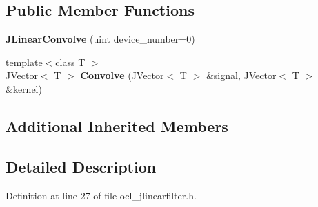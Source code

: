 \subsection*{Public Member Functions}
\begin{DoxyCompactItemize}
\item 
{\bfseries J\+Linear\+Convolve} (uint device\+\_\+number=0)\hypertarget{classjaspl_1_1ocl_1_1_j_linear_convolve_ac23d0dd668a469eb7ea80197c0074479}{}\label{classjaspl_1_1ocl_1_1_j_linear_convolve_ac23d0dd668a469eb7ea80197c0074479}

\item 
{\footnotesize template$<$class T $>$ }\\\hyperlink{classjaspl_1_1_j_vector}{J\+Vector}$<$ T $>$ {\bfseries Convolve} (\hyperlink{classjaspl_1_1_j_vector}{J\+Vector}$<$ T $>$ \&signal, \hyperlink{classjaspl_1_1_j_vector}{J\+Vector}$<$ T $>$ \&kernel)\hypertarget{classjaspl_1_1ocl_1_1_j_linear_convolve_a49242f52e8286cdb0844d15b5339fb6a}{}\label{classjaspl_1_1ocl_1_1_j_linear_convolve_a49242f52e8286cdb0844d15b5339fb6a}

\end{DoxyCompactItemize}
\subsection*{Additional Inherited Members}


\subsection{Detailed Description}


Definition at line 27 of file ocl\+\_\+jlinearfilter.\+h.

